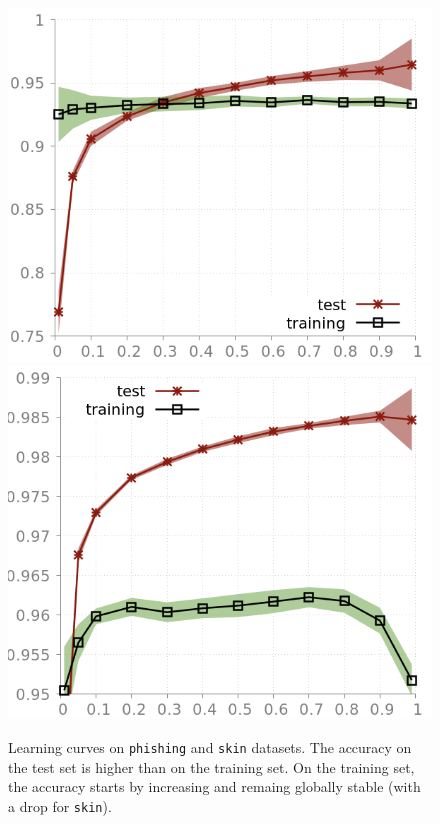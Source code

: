 \documentclass[preprint,12pt]{elsarticle}
\theoremstyle{definition}
\begin{document}
\begin{figure}[!h]\centering
\includegraphics[scale=0.3]{img/learning_curve_phishing.png}
\hfill
\includegraphics[scale=0.3]{img/learning_curve_skin.png}
\caption{Learning curves on \texttt{phishing} and \texttt{skin} datasets. The accuracy on the test set is higher than on the training set. On the training set, the accuracy starts by increasing and remaing globally stable (with a drop for \texttt{skin}).}
\label{fig:learning_curve_3}
\end{figure}
\end{document}
